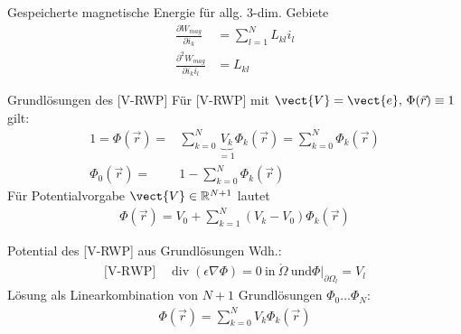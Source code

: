 \documentclass[a6paper]{kartei}
\begin{document}
\begin{karte}{Gespeicherte magnetische Energie für allg. 3-dim. Gebiete}
\begin{align}
\frac{\partial W_{mag}}{\partial i_{k}} & = \sum \limits_{l = 1}^{N} L_{kl} i_{l}   \\
\frac{\partial^{2} W_{mag}}{\partial i_{k}i_{l}} & = L_{kl}
\end{align}
\end{karte}
\begin{karte}{Grundlösungen des [V-RWP]}
Für [V-RWP] mit $\vect{V} = \vect{e}, \, \Phi(\vec{r}) \equiv 1$ gilt:
\begin{align}
1 = \Phi(\vec{r}) = & \sum \limits_{k=0}^{N} \underbrace{V_{k}}_{=1} \Phi_{k}(\vec{r})  =  \sum \limits_{k=0}^{N} \Phi_{k}(\vec{r}) \nonumber \\
\Phi_{0}(\vec{r}) = & 1 - \sum \limits_{k=0}^{N} \Phi_{k}(\vec{r})
\end{align}
Für Potentialvorgabe $\vect{V} \in \mathbb{R}^{N+1}$ lautet
\begin{align}
\Phi(\vec{r}) = V_{0} + \sum \limits_{k=1}^{N} (V_{k}-V_{0}) \Phi_{k}(\vec{r})
\end{align}
\end{karte}


\begin{karte}{Potential des [V-RWP] aus Grundlösungen}
Wdh.: \begin{eqnarray*}
 \text{[V-RWP]} \quad \operatorname{div}(\epsilon \nabla \Phi) = 0 \ \text{in} \ \mathring{\Omega}
  \ \text{und} \left. \Phi\right|_{\partial \Omega_{l}} = V_{l} \nonumber
\end{eqnarray*}
Lösung als Linearkombination von $N+1$ Grundlösungen $\Phi_{0} \dots \Phi_{N}$:
\begin{eqnarray*}
\Phi(\vec{r}) = \sum \limits_{k=0}^{N} V_{k} \Phi_{k}(\vec{r})
\end{eqnarray*}
\end{karte}
\end{document}

